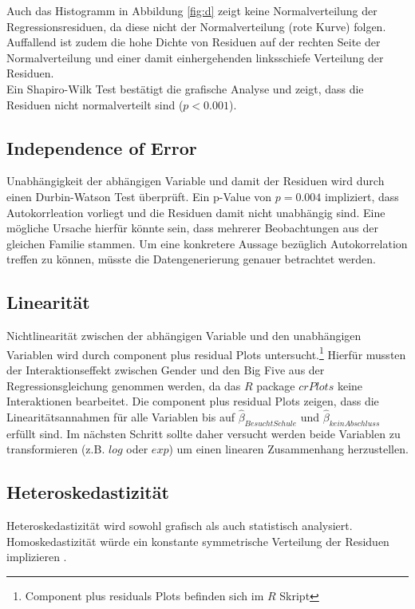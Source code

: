 \documentclass[11pt,a4paper]{article}
\begin{document}
Auch das Histogramm in Abbildung \ref{fig:d} zeigt keine Normalverteilung der Regressionsresiduen, da diese nicht der Normalverteilung (rote Kurve) folgen. Auffallend ist zudem die hohe Dichte von Residuen auf der rechten Seite der Normalverteilung und einer damit einhergehenden linksschiefe Verteilung der Residuen.\\  

Ein Shapiro-Wilk Test bestätigt die grafische Analyse und zeigt, dass die Residuen nicht normalverteilt sind ($p < 0.001$).


\subsection{Independence of Error}
Unabhängigkeit der abhängigen Variable und damit der Residuen wird durch einen Durbin-Watson Test überprüft. Ein p-Value von $p = 0.004$ impliziert, dass Autokorrleation vorliegt und die Residuen damit nicht unabhängig sind. Eine mögliche Ursache hierfür könnte sein, dass mehrerer Beobachtungen aus der gleichen Familie stammen. Um eine konkretere Aussage bezüglich Autokorrelation treffen zu können, müsste die Datengenerierung genauer betrachtet werden. 


\subsection{Linearität}
Nichtlinearität zwischen der abhängigen Variable und den unabhängigen Variablen wird durch component plus residual Plots untersucht.\footnote{Component plus residuals Plots befinden sich im $R$ Skript} Hierfür mussten der Interaktionseffekt zwischen Gender und den Big Five aus der Regressionsgleichung genommen werden, da das $R$ package $crPlots$ keine Interaktionen bearbeitet. Die component plus residual Plots zeigen, dass die Linearitätsannahmen für alle Variablen bis auf $\hat{\beta}_{Besucht Schule}$ und $\hat{\beta}_{kein Abschluss}$ erfüllt sind. Im nächsten Schritt sollte daher versucht werden beide Variablen zu transformieren (z.B. $log$ oder $exp$) um einen linearen Zusammenhang herzustellen. 


\subsection{Heteroskedastizität}
Heteroskedastizität wird sowohl grafisch als auch statistisch analysiert. Homoskedastizität würde ein konstante symmetrische Verteilung der Residuen implizieren \parencite{faraway2014linear}. 
\end{document}

